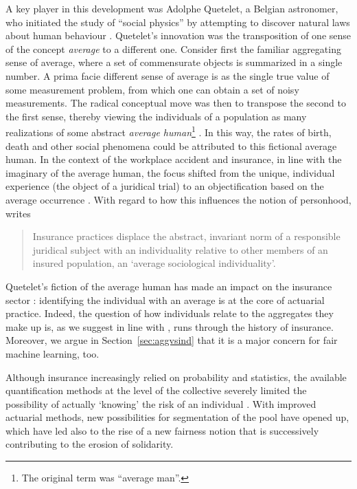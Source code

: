 \documentclass[11pt]{article} %
\begin{document}
A key player in this development was Adolphe Quetelet, a Belgian astronomer, who initiated the study of ``social physics'' by attempting to discover natural laws about human behaviour \citep{mcfall2011good}.
Quetelet's innovation was the transposition of one sense of the concept \textit{average} to a different one. Consider first the familiar aggregating sense of average, where a set of commensurate objects is summarized in a single number. A prima facie different sense of average is as the single true value of some measurement problem, from which one can obtain a set of noisy measurements. The radical conceptual move was then to transpose the second to the first sense, thereby viewing the individuals of a population as many realizations of some abstract \textit{average human}\footnote{
The original term was ``average man''.
} \citep{ewald1990norms,mcfall2011good}. In this way, the rates of birth, death and other social phenomena could be attributed to this fictional average human.  In the context of the workplace accident and insurance, in line with the imaginary of the average human, the focus shifted from the unique, individual experience (the object of a juridical trial) to an objectification based on the average occurrence \citep{krippner2023unmasked}. With regard to how this influences the notion of personhood, \citet{dean1998risk} writes
\begin{quote}
    Insurance practices displace the abstract, invariant norm of a responsible juridical subject with an individuality relative to other members of an insured population, an `average sociological individuality'.
\end{quote}
Quetelet's fiction of the average human has made an impact on the insurance sector \citep{mcfall2011good}: identifying the individual with an average is at the core of actuarial practice.
Indeed, the question of how individuals relate to the aggregates they make up is, as we suggest in line with \citet{krippner2023unmasked}, runs through the history of insurance. Moreover, we argue in Section~\ref{sec:aggvsind} that it is a major concern for fair machine learning, too.

Although insurance increasingly relied on probability and statistics, the available quantification methods at the level of the collective severely limited the possibility of actually `knowing' the risk of an individual \citep{barry2019rationality}. With improved actuarial methods, new possibilities for segmentation of the pool have opened up, which have led also to the rise of a new fairness notion that is successively contributing to the erosion of solidarity.
\end{document}
